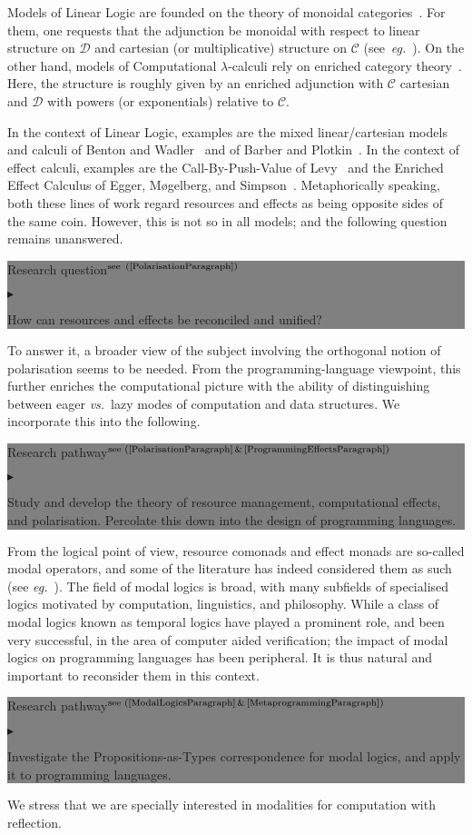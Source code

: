 \documentclass[11pt,twocolumn]{article}
\newenvironment{btritemize}
  {\begin{list}{\btr}
  {\setlength{\topsep}{2pt}
   \setlength{\partopsep}{2pt}
   \setlength{\itemsep}{2.5pt}
   \setlength{\parsep}{2.5pt}
   \setlength{\leftmargin}{1em}
   \setlength{\labelwidth}{.5em}}}
  {\end{list}}
\newcommand{\mytextsf}[1]{\textsf{\small #1}}
\newcommand{\pref}[1]{\,(\ref{#1})}
\newcommand{\eg}{\emph{eg.}}
\newcommand{\vs}{\emph{vs.}}
\newcommand{\btr}{$\blacktriangleright$}
\newcommand{\reqpsize}{8.113395cm}%
\newcommand{\req}[2]{\begin{center}\colorbox{grey}{\begin{minipage}{\reqpsize} 
  \mytextsf{Research question}\hfill$^{\mbox{\scriptsize see #1 }}$\\[-5.5mm]
  \begin{btritemize}
  \item #2
  \end{btritemize}
\end{minipage}}\end{center}}
\newcommand{\rep}[2]{\begin{center}\colorbox{grey}{\begin{minipage}{\reqpsize}
  \mytextsf{Research pathway}\hfill$^{\mbox{\scriptsize see #1 }}$\\[-5.5mm]
  \begin{btritemize}
  \item #2
  \end{btritemize}
\end{minipage}}\end{center}}
\newcommand{\cat}[1]{\mathscr{#1}}
\begin{document}
Models of Linear Logic are founded on the theory of
monoidal categories~\cite[Chapter~VII.1]{MacLane}.  For them, one requests
that the adjunction be monoidal with respect to linear structure on $\cat D$
and cartesian (or multiplicative) structure on $\cat C$
(see~\eg~\cite{MelliesCMLL}).  On the other hand, models of Computational
\mbox{$\lambda$-calculi} rely on enriched category theory~\cite{KellyBook}.
Here, the structure is roughly given by an enriched adjunction with $\cat C$
cartesian and $\cat D$ with powers (or exponentials) relative to $\cat C$.

In the context of Linear Logic, examples are the mixed linear/cartesian models
and calculi of Benton and Wadler~\cite{BentonWadler} and of Barber and
Plotkin~\cite{BarberPlotkin}.  In the context of effect calculi, examples are
the Call-By-Push-Value of Levy~\cite{LevyCBPV} and the Enriched Effect
Calculus of Egger, M{\o}gelberg, and Simpson~\cite{EEC}.  Metaphorically
speaking, both these lines of work regard resources and effects as being
opposite sides of the same coin.  However, this is not so in all models;
and the following question remains unanswered.
%
\req{\pref{PolarisationParagraph}}
  {How can resources and effects be reconciled and unified?}
%
To answer it, a broader view of the subject involving the orthogonal
notion of polarisation seems to be needed.  From the programming-language
viewpoint, this further enriches the computational picture with the
ability of distinguishing between eager \vs~lazy modes of computation and
data structures.  We incorporate this into the following.
%
\rep{(\ref{PolarisationParagraph}\,\&\,\ref{ProgrammingEffectsParagraph})}
  {Study and develop the theory of resource management, computational
    effects, and polarisation.  Percolate this down into the design of
    programming languages.}

From the logical point of view, resource comonads and effect monads are
so-called modal operators, and some of the literature has indeed
considered them as such (see \eg~\cite{Kobayashi}).  %
The field of modal logics is broad, with many subfields of specialised
logics motivated by computation, linguistics, and philosophy.  While a
class of modal logics known as temporal logics have played a prominent
role, and been very successful, in the area of computer aided verification;
the impact of modal logics on programming languages has been peripheral.
It is thus natural and important to reconsider them in this context. 
%
\rep{(\ref{ModalLogicsParagraph}\,\&\,\ref{MetaprogrammingParagraph})}
  {Investigate the Propositions-as-Types 
    correspondence %
    for modal logics, and apply it to programming languages.}
We stress that we are specially interested in modalities for computation with
reflection.
\end{document}
